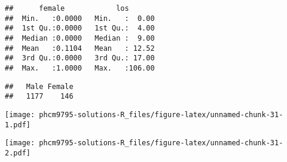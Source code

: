 \documentclass[
]{memoir}
\newenvironment{Shaded}{\begin{snugshade}}{\end{snugshade}}
\newcommand{\AttributeTok}[1]{\textcolor[rgb]{0.77,0.63,0.00}{#1}}
\newcommand{\CommentTok}[1]{\textcolor[rgb]{0.56,0.35,0.01}{\textit{#1}}}
\newcommand{\DecValTok}[1]{\textcolor[rgb]{0.00,0.00,0.81}{#1}}
\newcommand{\FunctionTok}[1]{\textcolor[rgb]{0.00,0.00,0.00}{#1}}
\newcommand{\NormalTok}[1]{#1}
\newcommand{\OtherTok}[1]{\textcolor[rgb]{0.56,0.35,0.01}{#1}}
\newcommand{\SpecialCharTok}[1]{\textcolor[rgb]{0.00,0.00,0.00}{#1}}
\newcommand{\StringTok}[1]{\textcolor[rgb]{0.31,0.60,0.02}{#1}}
\begin{document}
\begin{verbatim}
##      female            los        
##  Min.   :0.0000   Min.   :  0.00  
##  1st Qu.:0.0000   1st Qu.:  4.00  
##  Median :0.0000   Median :  9.00  
##  Mean   :0.1104   Mean   : 12.52  
##  3rd Qu.:0.0000   3rd Qu.: 17.00  
##  Max.   :1.0000   Max.   :106.00
\end{verbatim}

\begin{Shaded}
\end{Shaded}

\begin{verbatim}
##   Male Female 
##   1177    146
\end{verbatim}

\begin{Shaded}
\end{Shaded}

\texttt{[image: phcm9795-solutions-R\_files/figure-latex/unnamed-chunk-31-1.pdf]}

\begin{Shaded}
\end{Shaded}

\texttt{[image: phcm9795-solutions-R\_files/figure-latex/unnamed-chunk-31-2.pdf]}
\end{document}
